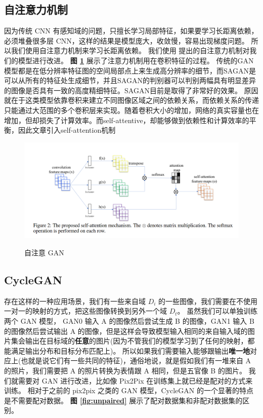 \subsection{自注意力机制}
因为传统 CNN 有感知域的问题，只擅长学习局部特征，如果要学习长距离依赖，必须堆叠很多层 CNN，这样的结果是模型庞大，收敛慢，容易出现梯度问题。
所以我们使用自注意力机制来学习长距离依赖。
我们使用 提出的自注意力机制对我们的模型进行改进。
\textbf{图 \ref{fig:sagan}} 展示了注意力机制用在卷积特征的过程。
传统的GAN模型都是在低分辨率特征图的空间局部点上来生成高分辨率的细节，而SAGAN是可以从所有的特征处生成细节，并且SAGAN的判别器可以判别两幅具有明显差异的图像是否具有一致的高度精细特征。SAGAN目前是取得了非常好的效果。
原因就在于这类模型依靠卷积来建立不同图像区域之间的依赖关系，而依赖关系的传递只能通过大范围的多个卷积层来实现。随着卷积大小的增加，网络的真实容量也在增加，但却损失了计算效率。而self-attentive，却能够做到依赖性和计算效率的平衡，因此文章引入self-attention机制

\begin{figure}[h!]
	\caption{自注意 GAN}
	\centering
	\includegraphics[width=\textwidth]{SAGAN.png}
	\label{fig:sagan}
\end{figure}


\subsection{CycleGAN}
存在这样的一种应用场景，我们有一些来自域 $D_i$ 的一些图像，我们需要在不使用一对一的映射的方式，把这些图像转换到另外一个域 $D_t$。
虽然我们可以单独训练两个 GAN 模型， GAN0 输入 A 的图像然后尝试生成 B 的图像，GAN1 输入 B 的图像然后尝试输出 A 的图像，但是这样会导致模型输入相同的来自输入域的图片集会输出在目标域的\textbf{任意}的图片(因为不管我们的模型学习到了任何的映射，都能满足输出分布和目标分布匹配上)。
所以如果我们需要输入能够跟输出\textbf{唯一地}对应上(也就是说它们有一些共同的特征)，通俗地说，就是假如我们有一堆来自 A 的照片，我们需要把 A 的照片转换为表情跟 A 相同，但是五官像 B 的图片。
我们就需要对 GAN 进行改进，比如像 Pix2Pix 在训练集上就已经是配对的方式来训练。
相对于之前的 pix2pix 之类的 GAN 模型，CycleGAN 的一个显著的特点是不需要配对数据。
\textbf{图 \ref{fig:unpaired}} 展示了配对数据集和非配对数据集的区别。


